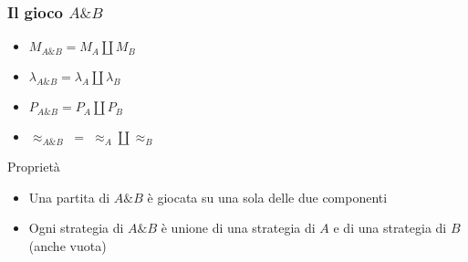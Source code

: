 \documentclass{beamer}
\begin{document}
\begin{frame}
	
	\frametitle{Il gioco $A \& B$}
	
	\begin{itemize}
		\item $M_{A\& B}=M_A \coprod M_B$
		\item $\lambda_{A\& B}=\lambda_A \coprod \lambda_B$
		\item $P_{A\& B}=P_A \coprod P_B$
		\item $\approx_{A\& B} \; = \; \approx_A \coprod \approx_B$ 
	\end{itemize}
	
	\begin{block}{Proprietà}
		\begin{itemize}
			\item Una partita di $A\& B$ è giocata su una sola delle due componenti
			\item Ogni strategia di $A\& B$ è unione di una strategia di $A$ e di una strategia di $B$ (anche vuota)
		\end{itemize}
		
	\end{block}
	
\end{frame}


\begin{frame}[t]

	
\end{frame}
\end{document}
